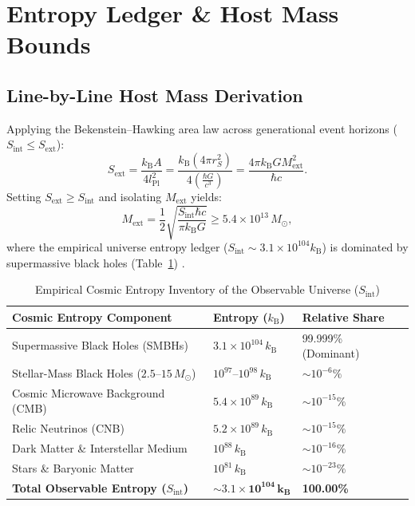 \documentclass[11pt,a4paper]{article}
\begin{document}
\section{Entropy Ledger \& Host Mass Bounds}\label{sec:entropy_mass}

\subsection{Line-by-Line Host Mass Derivation}\label{sec:mass_derivation}
Applying the Bekenstein--Hawking area law across generational event horizons ($S_{\text{int}} \le S_{\text{ext}}$):
\begin{equation}\label{eq:entropy_formula}
    S_{\text{ext}} = \frac{k_{\text{B}} A}{4 l_{\text{Pl}}^2} = \frac{k_{\text{B}} (4\pi r_S^2)}{4 \left(\frac{\hbar G}{c^3}\right)} = \frac{4\pi k_{\text{B}} G M_{\text{ext}}^2}{\hbar c}.
\end{equation}
Setting $S_{\text{ext}} \ge S_{\text{int}}$ and isolating $M_{\text{ext}}$ yields:
\begin{equation}\label{eq:parent_bound}
    M_{\text{ext}} = \frac{1}{2}\sqrt{\frac{S_{\text{int}} \hbar c}{\pi k_{\text{B}} G}} \ge 5.4 \times 10^{13} \, M_\odot,
\end{equation}
where the empirical universe entropy ledger ($S_{\text{int}} \sim 3.1 \times 10^{104} k_{\text{B}}$) is dominated by supermassive black holes (Table~\ref{table:entropy_ledger}) \cite{egan2010}.

\begin{table}[H]
\centering
\caption{Empirical Cosmic Entropy Inventory of the Observable Universe ($S_{\text{int}}$)}\label{table:entropy_ledger}
\begin{tabular}{p{6.2cm}p{4.8cm}p{3.5cm}}
\toprule
\textbf{Cosmic Entropy Component} & \textbf{Entropy ($k_{\text{B}}$)} & \textbf{Relative Share} \\
\midrule
Supermassive Black Holes (SMBHs) & $3.1 \times 10^{104} \, k_{\text{B}}$ & 99.999\% (Dominant) \\
Stellar-Mass Black Holes ($2.5\text{--}15 \, M_\odot$) & $10^{97}\text{--}10^{98} \, k_{\text{B}}$ & $\sim 10^{-6}\%$ \\
Cosmic Microwave Background (CMB) & $5.4 \times 10^{89} \, k_{\text{B}}$ & $\sim 10^{-15}\%$ \\
Relic Neutrinos (CNB) & $5.2 \times 10^{89} \, k_{\text{B}}$ & $\sim 10^{-15}\%$ \\
Dark Matter \& Interstellar Medium & $10^{88} \, k_{\text{B}}$ & $\sim 10^{-16}\%$ \\
Stars \& Baryonic Matter & $10^{81} \, k_{\text{B}}$ & $\sim 10^{-23}\%$ \\
\midrule
\textbf{Total Observable Entropy ($S_{\text{int}}$)} & $\mathbf{\sim 3.1 \times 10^{104} \, k_{\text{B}}}$ & \textbf{100.00\%} \\
\bottomrule
\end{tabular}
\end{table}
\end{document}
